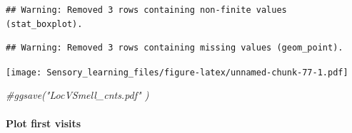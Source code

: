 \documentclass[]{article}
\newenvironment{Shaded}{\begin{snugshade}}{\end{snugshade}}
\newcommand{\CommentTok}[1]{\textcolor[rgb]{0.56,0.35,0.01}{\textit{{#1}}}}
\let\oldparagraph\paragraph
\renewcommand{\paragraph}[1]{\oldparagraph{#1}\mbox{}}
\begin{document}
\begin{verbatim}
## Warning: Removed 3 rows containing non-finite values (stat_boxplot).
\end{verbatim}

\begin{verbatim}
## Warning: Removed 3 rows containing missing values (geom_point).
\end{verbatim}

\texttt{[image: Sensory\_learning\_files/figure-latex/unnamed-chunk-77-1.pdf]}

\begin{Shaded}
\begin{Highlighting}[]
\CommentTok{#ggsave("LocVSmell_cnts.pdf"  )}
\end{Highlighting}
\end{Shaded}

\paragraph{Plot first visits}\label{plot-first-visits-3}
\end{document}
